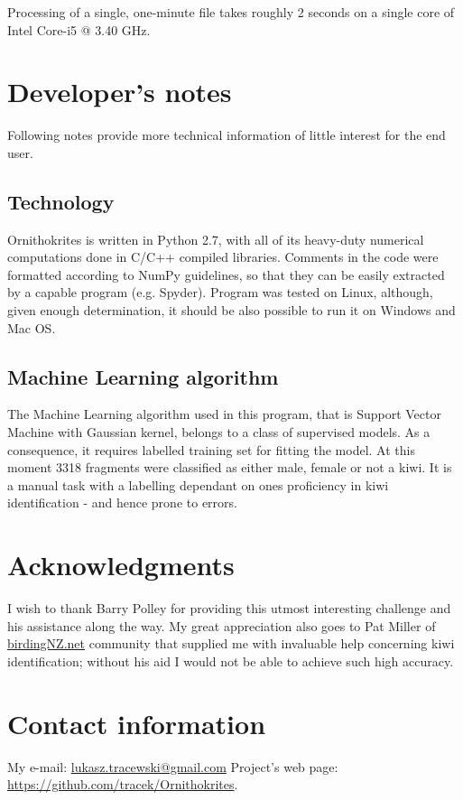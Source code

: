 \documentclass[paper=a4, fontsize=11pt]{scrartcl}	%
\numberwithin{equation}{section}		%
\numberwithin{figure}{section}			%
\numberwithin{table}{section}				%
\begin{document}
Processing of a single, one-minute file takes roughly 2 seconds on a single core of Intel Core-i5 @ 3.40 GHz.

\section{Developer's notes}
Following notes provide more technical information of little interest for the end user.
\subsection{Technology}
Ornithokrites is written in Python 2.7, with all of its heavy-duty numerical computations done in C/C++ compiled libraries. Comments in the code were formatted according to NumPy guidelines, so that they can be easily extracted by a capable program (e.g. Spyder). Program was tested on Linux, although, given enough determination, it should be also possible to run it on Windows and Mac OS.
\subsection{Machine Learning algorithm}
The Machine Learning algorithm used in this program, that is Support Vector Machine with Gaussian kernel, belongs to a class of supervised models. As a consequence, it requires labelled training set for fitting the model. At this moment 3318 fragments were classified as either male, female or not a kiwi. It is a manual task with a labelling dependant on ones proficiency in kiwi identification - and hence prone to errors.

\section{Acknowledgments}
I wish to thank Barry Polley for providing this utmost interesting challenge and his assistance along the way. My great appreciation also goes to Pat Miller of \url{birdingNZ.net} community that supplied me with invaluable help concerning kiwi identification; without his aid I would not be able to achieve such high accuracy.

\section{Contact information}
My e-mail: \href{mailto:lukasz.tracewski@gmail.com}{lukasz.tracewski@gmail.com}
\newline
Project's web page: \url{https://github.com/tracek/Ornithokrites}.

\end{document}
